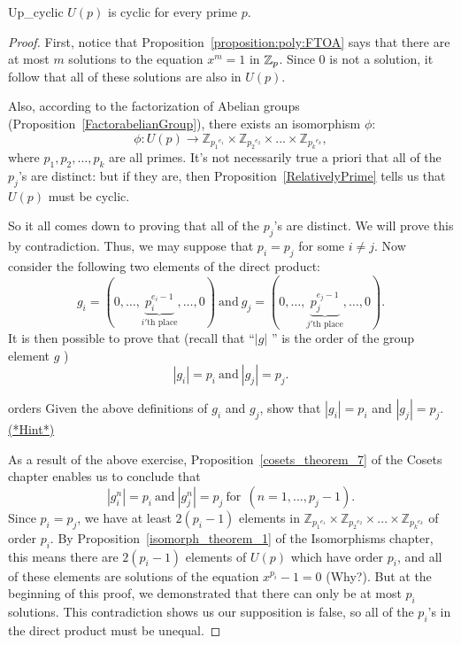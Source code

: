 \begin {prop}{Up_cyclic}
$U(p)$ is cyclic for every prime $p$.
\end {prop}
\begin {proof}
First, notice that Proposition~\ref{proposition:poly:FTOA} says that there are at most $m$ solutions to the equation $x^m = 1$ in $\mathbb{Z}_p$. Since 0 is not a solution, it follow that all of these solutions are also in $U(p)$.

Also, according to the factorization of Abelian groups (Proposition~\ref{FactorabelianGroup}), there exists an isomorphism $\phi$:
\[\phi: U(p)  \rightarrow {\mathbb{Z}_{{p_1}^{e_1}}}  \times   {\mathbb{Z}_{{p_2}^{e_2}}}  \times  ... \times   {\mathbb{Z}_{{p_k}^{e_k}}},\]
where $p_1, p_2, \ldots, p_k$ are all primes.  It's not necessarily true a priori  that all of the $p_j$'s are distinct: but if they are, then Proposition~\ref{RelativelyPrime} tells us that $U(p)$ must be cyclic. 

So it all comes down to proving that all of the $p_j$'s are distinct. We will prove this by contradiction. Thus, we may suppose that $p_i = p_j$ for some $i \neq j$. 
Now consider the following two elements of the direct product:
\[
g_i = ( 0, \ldots ,\underbrace{p_i^{e_i-1}}_{i'\text{th place}},\ldots,0) \mathrm{~ and ~} g_j = ( 0, \ldots ,\underbrace{p_j^{e_j-1}}_{j'\text{th place}},\ldots,0).
\]
It is then possible to prove that (recall that ``$|g|$ '' is the order of the group element $g$ )
\[ |g_i| = p_i \mathrm{~ and ~}  |g_j| = p_j. \]

\begin{exercise}{orders}
Given the above definitions of $g_i$ and $g_j$, show that   $|g_i| = p_i$ and  $|g_j| = p_j$.
\hyperref[sec:polyrings:hints]{(*Hint*)} 
\end{exercise}
As a result of the above exercise, Proposition~\ref{cosets_theorem_7} of the Cosets chapter  enables us to conclude that 
\[
|g_i^n| = p_i \mathrm{~ and ~} |g_j^n| = p_j \mathrm{~ for~~} (n = 1,...,p_j-1).
\]
Since $p_i = p_j$, we have at least $2(p_i-1)$ elements in ${\mathbb{Z}_{{p_1}^{e_1}}}  \times   {\mathbb{Z}_{{p_2}^{e_2}}}  \times  ... \times   {\mathbb{Z}_{{p_k}^{e_k}}}$ of order $p_i$. By 
Proposition~\ref{isomorph_theorem_1} of the Isomorphisms chapter, this means there are  $2(p_i-1)$ elements of $U(p)$ which have order $p_i$, and all of these elements are solutions of the equation $x^{p_i}-1=0$ (Why?). 
But at the beginning of this proof, we demonstrated that there can only be at most $p_i$ solutions. This contradiction shows us our supposition is false, so all of the $p_i$'s in the direct product must be unequal.
\end{proof}


